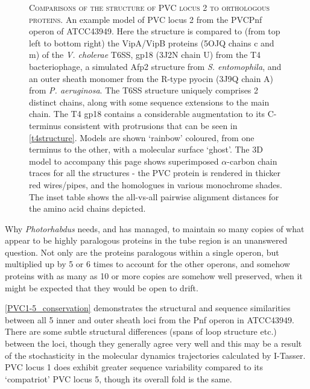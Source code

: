 \begin{figure}[p]
\begin{subfigure}[H]{\textwidth}
\begin{tabularx}{1.01\textwidth}{CCCCCCC}
\end{tabularx}
\end{subfigure}  
 \captionsetup{singlelinecheck=off, justification=justified, font=footnotesize, aboveskip=20pt}
 \caption[PVC2 homolog comparisons]{\textsc{\normalsize Comparisons of the structure of PVC locus 2 to orthologous proteins.}\vspace{0.1cm} \newline An example model of PVC locus 2 from the PVCPnf operon of \Pasy{} ATCC43949. Here the structure is compared to (from top left to bottom right) the VipA/VipB proteins (5OJQ chains c and m) of the \emph{V. cholerae} T6SS, gp18 (3J2N chain U) from the T4 bacteriophage, a simulated Afp2 structure from \emph{S. entomophila}, and an outer sheath monomer from the R-type pyocin (3J9Q chain A) from \emph{P. aeruginosa}. The T6SS structure uniquely comprises 2 distinct chains, along with some sequence extensions to the main chain. The T4 gp18 contains a considerable augmentation to its C-terminus consistent with protrusions that can be seen in \vref{t4structure}. Models are shown `rainbow' coloured, from one terminus to the other, with a molecular surface `ghost'. The 3D model to accompany this page shows superimposed $\alpha$-carbon chain traces for all the structures - the PVC protein is rendered in thicker red wires/pipes, and the homologues in various monochrome shades. The inset table shows the all-vs-all pairwise alignment distances for the amino acid chains depicted.}
	\label{PVC2comparisons}
\end{figure}

\clearpage
{}\label{duptrip}
Why \emph{Photorhabdus} needs, and has managed, to maintain so many copies of what appear to be highly paralogous proteins in the tube region is an unanswered question. Not only are the proteins paralogous within a single operon, but multiplied up by 5 or 6 times to account for the other operons, and somehow proteins with as many as 10 or more copies are somehow well preserved, when it might be expected that they would be open to drift.

\vref{PVC1-5_conservation} demonstrates the structural and sequence similarities between all 5 inner and outer sheath loci from the Pnf operon in \Pasy{} ATCC43949. There are some subtle structural differences (spans of loop structure etc.) between the loci, though they generally agree very well and this may be a result of the stochasticity in the molecular dynamics trajectories calculated by I-Tasser. PVC locus 1 does exhibit greater sequence variability compared to its `compatriot' PVC locus 5, though its overall fold is the same.

